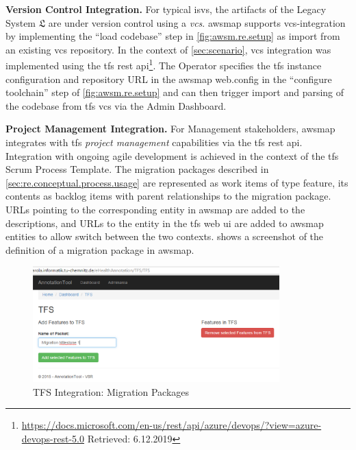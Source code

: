 \textbf{Version Control Integration.} For typical \glspl{isv}, the \glspl{artifact} of the \gls{Legacy System} \(\mathfrak{L}\) are under version control using a \emph{\gls{vcs}}.
\gls{awsmap} supports \gls{vcs}-integration by implementing the ``load codebase'' step in \cref{fig:awsm.re.setup} as import from an existing \gls{vcs} repository.
In the context of \cref{sec:scenario}, \gls{vcs} integration was implemented using the \gls{tfs} \gls{rest} \gls{api}\footnote{\url{https://docs.microsoft.com/en-us/rest/api/azure/devops/?view=azure-devops-rest-5.0} Retrieved: 6.12.2019}.
The Operator specifies the \gls{tfs} instance configuration and repository URL in the \gls{awsmap} web.config in the ``configure toolchain'' step of \cref{fig:awsm.re.setup} and can then trigger import and parsing of the codebase from \gls{tfs} \gls{vcs} via the Admin Dashboard.

\textbf{Project Management Integration.} For Management stakeholders, \gls{awsmap} integrates with \gls{tfs} \emph{project management} capabilities via the \gls{tfs} \gls{rest} \gls{api}.
Integration with ongoing agile development is achieved in the context of the \gls{tfs} Scrum Process Template.
The migration packages described in \cref{sec:re.conceptual.process.usage} are represented as work items of type feature, its contents as backlog items with parent relationships to the migration package.
URLs pointing to the corresponding entity in \gls{awsmap} are added to the descriptions, and URLs to the entity in the \gls{tfs} \gls{web} \gls{ui} are added to \gls{awsmap} entities to allow switch between the two contexts.
 shows a screenshot of the definition of a migration package in \gls{awsmap}.
\begin{figure}[h!]
\hypertarget{fig:tfs-integration}{%
\centering
\includegraphics[width=0.85\textwidth]{../figures/screenshots/tfs-integration-migrationpackages.png}
\caption{TFS Integration: Migration Packages}\label{fig:tfs-integration}
}
\end{figure}

